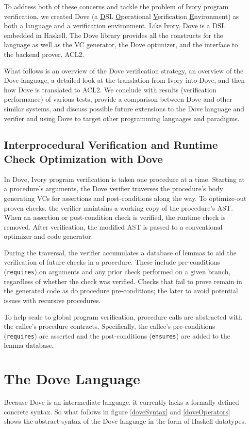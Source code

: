 \documentclass{article}
\begin{document}
To address both of these concerns and tackle the problem of Ivory program
verification, we created Dove (a \underline{D}SL \underline{O}perational \underline{V}erification \underline{E}nvironment)
as both a language and a verification environment.  Like Ivory,
Dove is a DSL embedded in Haskell.  The Dove library provides all the 
constructs for the language as well as the VC generator, the Dove optimizer,
and the interface to the backend prover, ACL2.

What follows is an overview of the Dove verification strategy,
an overview of the Dove language, a detailed look at the translation from
Ivory into Dove, and then how Dove is translated to ACL2.
We conclude with results (verification performance) of various tests,
provide a comparison between Dove and other similar systems,
and discuss possible future extensions
to the Dove language and verifier and using Dove to target other programming
languages and paradigms.

\subsection{Interprocedural Verification and Runtime Check Optimization with Dove}

In Dove, Ivory program verification is taken one procedure at a time.
Starting at a procedure's arguments, the Dove verifier traverses
the procedure's body generating VCs for assertions and post-conditions along the way.
To optimize-out proven checks, the verifier maintains a working copy of the procedure's AST.
When an assertion or post-condition check is verified, the runtime check is removed.
After verification, the modified AST is passed to a conventional optimizer and code generator.

During the traversal, the verifier accumulates a database of lemmas
to aid the verification of future checks in a procedure.
These include pre-conditions ({\tt requires}) on arguments
and any prior check performed on a given branch, regardless of whether the check was verified.
Checks that fail to prove remain in the generated code
as do procedure pre-conditions; the later to avoid potential issues with
recursive procedures.

To help scale to global program verification,
procedure calls are abstracted with the callee's procedure contracts.
Specifically, the callee's pre-conditions ({\tt requires}) are asserted
and the post-conditions ({\tt ensures}) are added to the lemma database.

\section{The Dove Language}
Because Dove is an intermediate language, it currently lacks a
formally defined concrete syntax.  So what follows in
figure \ref{doveSyntax} and \ref{doveOperators} shows
the abstract syntax of the Dove language in the form of 
Haskell datatypes.
\end{document}
